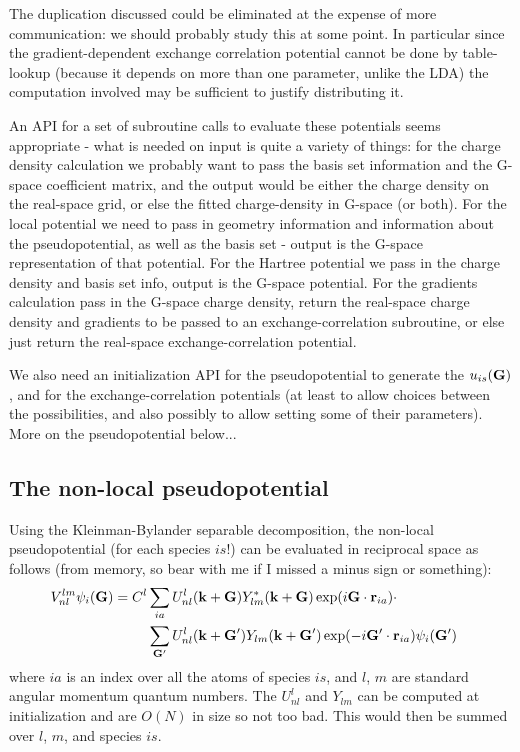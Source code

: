 The duplication discussed could be eliminated at the expense of
more communication: we should probably study this at some point. In
particular since the gradient-dependent exchange correlation potential 
cannot be done by table-lookup (because it depends on more than one
parameter, unlike the LDA) the computation involved may be sufficient
to justify distributing it.

An API for a set of subroutine calls to evaluate these potentials
seems appropriate - what is needed on input is quite a variety of
things: for the charge density calculation we probably want to
pass the basis set information and the G-space coefficient matrix,
and the output would be either the charge density on the real-space
grid, or else the fitted charge-density in G-space (or both).
For the local potential we need to pass in geometry information and
information about the pseudopotential, as well as the basis set - output
is the G-space representation of that potential. For the Hartree potential
we pass in the charge density and basis set info, output is the G-space
potential. For the gradients calculation pass in the G-space charge
density, return the real-space charge density and gradients to be
passed to an exchange-correlation subroutine, or else just return the
real-space exchange-correlation potential.

We also need an initialization API for the pseudopotential to
generate the $u_{is}({\bf G})$, and
for the exchange-correlation potentials (at least to allow
choices between the possibilities, and also possibly to allow
setting some of their parameters). More on the pseudopotential below...

\subsection{The non-local pseudopotential}
Using the Kleinman-Bylander separable decomposition, the non-local
pseudopotential (for each species $is$!) can be evaluated in
reciprocal space as follows (from memory, so bear with me if I
missed a minus sign or something):
\begin{eqnarray}
V_{nl}^{lm} \psi_i ({\bf G}) = C^l
		&\sum_{ia} U_{nl}^l({\bf k+G})Y_{lm}^*({\bf k + G})
		\exp(i {\bf G}\cdot{\bf r}_{ia}) \cdot \cr
		&\sum_{{\bf G}'} U_{nl}^l({\bf k + G}')Y_{lm}({\bf k + G}')
		\exp(-i {\bf G}'\cdot{\bf r}_{ia})
		\psi_i({\bf G}')\cr
\end{eqnarray}
where $ia$ is an index over all the atoms of species $is$, and $l$, $m$ are
standard angular momentum quantum numbers. The $U_{nl}^l$ and $Y_{lm}$
can be computed at initialization and are $O(N)$ in size so not too bad.
This would then be summed over $l$, $m$, and species $is$.

